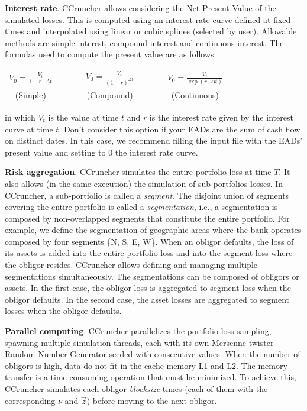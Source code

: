 \documentclass[11pt,fleqn]{book} %
\begin{document}
\textbf{Interest rate}. CCruncher allows considering the Net Present Value 
of the simulated losses. This is computed using an interest rate curve 
defined at fixed times and interpolated using linear or cubic splines 
(selected by user). Allowable methods are simple interest, compound interest 
and continuous interest. The formulas used to compute the present value are
as follows:
\begin{center}
	\begin{tabular}{ccccc}
		$V_0 = \frac{V_t}{1+r \cdot \Delta t}$ & $\qquad$ &
		$V_0 = \frac{V_t}{(1+r)^{\Delta t}}$ & $\qquad$ &
		$V_0 = \frac{V_t}{\exp(r \cdot \Delta t)}$ \\
		(Simple) & $\qquad$ & (Compound) & $\qquad$ & (Continuous)
	\end{tabular}
\end{center}
in which $V_t$ is the value at time $t$ and $r$ is the interest rate given 
by the interest curve at time $t$. Don't consider this option if your EADs
are the sum of cash flow on distinct dates. In this case, we recommend 
filling the input file with the EADs' present value and setting to $0$ the 
interest rate curve.

\textbf{Risk aggregation}. 
\label{ss:ra}
CCruncher simulates the entire portfolio loss at time $T$. It also allows 
(in the same execution) the simulation of sub-portfolios losses. In CCruncher, 
a sub-portfolio is called a \emph{segment}. The disjoint union of segments 
covering the entire portfolio is called a \emph{segmentation}, i.e., a 
segmentation is composed by non-overlapped segments that constitute the 
entire portfolio. For example, we define the segmentation of geographic
areas where the bank operates composed by four segments \{N, S, E, W\}.
When an obligor defaults, the loss of its assets is added into the 
entire portfolio loss and into the segment loss where the obligor resides.
CCruncher allows defining and managing multiple segmentations simultaneously. 
The segmentations can be composed of obligors or assets. In the first case, 
the obligor loss is aggregated to segment loss when the obligor defaults. 
In the second case, the asset losses are aggregated to segment losses when 
the obligor defaults.

\textbf{Parallel computing}. 
CCruncher parallelizes the portfolio loss sampling, spawning multiple 
simulation threads, each with its own Mersenne twister Random Number 
Generator seeded with consecutive values. When the number of obligors is 
high, data do not fit in the cache memory L1 and L2. The memory transfer is 
a time-consuming operation that must be minimized. To achieve this, CCruncher 
simulates each obligor \emph{blocksize} times (each of them with the 
corresponding $\nu$ and $\vec{z}$) before moving to the next obligor.
\end{document}
